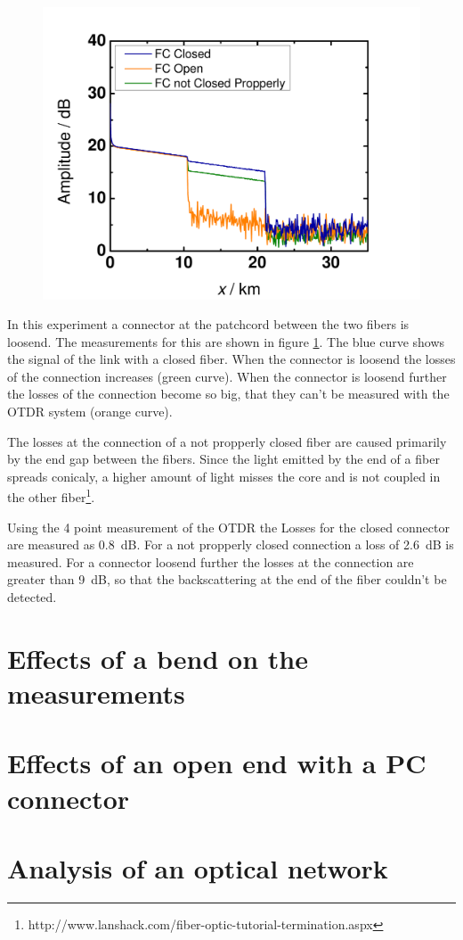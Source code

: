 \begin{figure}%
\centering
\includegraphics[width=.8\columnwidth]{grafiken/Connector.pdf}%
\caption{}%
\label{fig:connector}%
\end{figure}

In this experiment a connector at the patchcord between the two fibers is loosend. The measurements for this are shown in figure \ref{fig:connector}. The blue curve shows the signal of the link with a closed fiber. When the connector is loosend the losses of the connection increases (green curve). When the connector is loosend further the losses of the connection become so big, that they can't be measured with the OTDR system (orange curve). 

The losses at the connection of a not propperly closed fiber are caused primarily by the end gap between the fibers. Since the light emitted by the end of a fiber spreads conicaly, a higher amount of light misses the core and is not coupled in the other fiber\footnote[4]{http://www.lanshack.com/fiber-optic-tutorial-termination.aspx}.

Using the 4 point measurement of the OTDR the Losses for the closed connector are measured as 0.8~dB. For a not propperly closed connection a loss of 2.6~dB is measured. For a connector loosend further the losses at the connection are greater than 9~dB, so that the backscattering at the end of the fiber couldn't be detected.

\section{Effects of a bend on the measurements}



\section{Effects of an open end with a PC connector}

\section{Analysis of an optical network}



